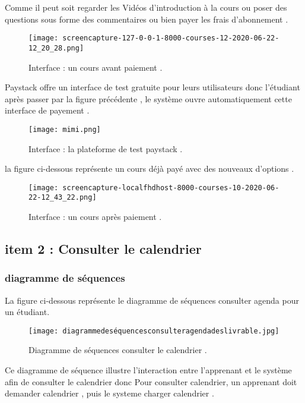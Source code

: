 \medskip

 Comme il peut soit regarder les Vidéos d'introduction à la cours ou poser des questions sous forme des commentaires  ou bien payer les frais d'abonnement .
\begin{figure}[ht]
	\centering
	\texttt{[image: screencapture-127-0-0-1-8000-courses-12-2020-06-22-12\_20\_28.png]}
	\caption{Interface : un cours avant paiement .}
	\label{fig:Interface :un cours avant paiement }
\end{figure}
\FloatBarrier
Paystack offre un interface de test gratuite pour leurs utilisateurs
donc l'étudiant après passer par la figure précédente , le système ouvre automatiquement cette interface de payement .
\begin{figure}[ht]
	\centering
	\texttt{[image: mimi.png]}
	\caption{Interface : la plateforme de test  paystack .}
	\label{fig:Interface : la plateforme de test  paystack }
\end{figure}
\FloatBarrier
la figure ci-dessous représente un cours déjà payé avec des nouveaux d'options .
\begin{figure}[ht]
	\centering
	\texttt{[image: screencapture-localfhdhost-8000-courses-10-2020-06-22-12\_43\_22.png]}
	\caption{Interface : un cours après paiement .}
	\label{fig:Interface :un cours après paiement }
\end{figure}
\FloatBarrier








\clearpage
\subsection{item 2 : Consulter le calendrier}
\subsubsection{diagramme de séquences }
La figure  ci-dessous représente le diagramme de séquences consulter agenda pour un  étudiant.

\begin{figure}[ht]
	\centering
	\texttt{[image: diagrammedeséquencesconsulteragendadeslivrable.jpg]}
	\caption{Diagramme de séquences consulter le calendrier  .}
	\label{fig:Diagramme de séquences consulter le calendrier }
\end{figure}
\FloatBarrier

Ce diagramme de séquence illustre l'interaction entre l'apprenant et le système afin de consulter le
calendrier donc  Pour consulter calendrier, un apprenant doit  demander calendrier , puis le systeme charger calendrier .
\clearpage
